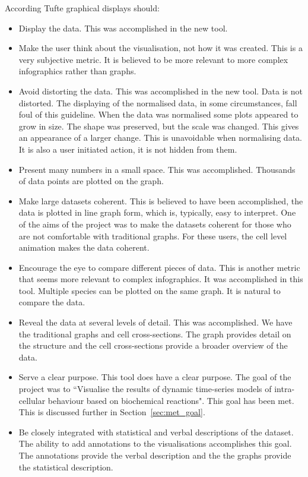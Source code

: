 According Tufte graphical displays should:
\begin{itemize}
\item Display the data.  This was accomplished in the new tool.
\item Make the user think about the visualisation, not how it was created.  This is a very subjective metric.  It is believed to be more relevant to more complex infographics rather than graphs.
\item Avoid distorting the data.  This was accomplished in the new tool.  Data is not distorted.  The displaying of the normalised data, in some circumstances, fall foul of this guideline.  When the data was normalised some plots appeared to grow in size.  The shape was preserved, but the scale was changed.  This gives an appearance of a larger change.  This is unavoidable when normalising data.  It is also a user initiated action, it is not hidden from them.
\item Present many numbers in a small space.  This was accomplished.  Thousands of data points are plotted on the graph.
\item Make large datasets coherent.  This is believed to have been accomplished, the data is plotted in line graph form, which is, typically, easy to interpret.  One of the aims of the project was to make the datasets coherent for those who are not comfortable with traditional graphs.  For these users, the cell level animation makes the data coherent.
\item Encourage the eye to compare different pieces of data.  This is another metric that seems more relevant to complex infographics.  It was accomplished in this tool.  Multiple species can be plotted on the same graph.  It is natural to compare the data.
\item Reveal the data at several levels of detail.  This was accomplished.
We have the traditional graphs and cell cross-sections.  The graph provides detail on the structure and the cell cross-sections provide a broader overview of the data.
\item Serve a clear purpose.  This tool does have a clear purpose. The goal of the project was to ``Visualise the results of dynamic time-series models of intra-cellular behaviour based on biochemical reactions".  This goal has been met.  This is discussed further in Section~\ref{sec:met_goal}.
\item Be closely integrated with statistical and verbal descriptions of the dataset.  The ability to add annotations to the visualisations accomplishes this goal.  The annotations provide the verbal description and the the graphs provide the statistical description.
\end{itemize}

